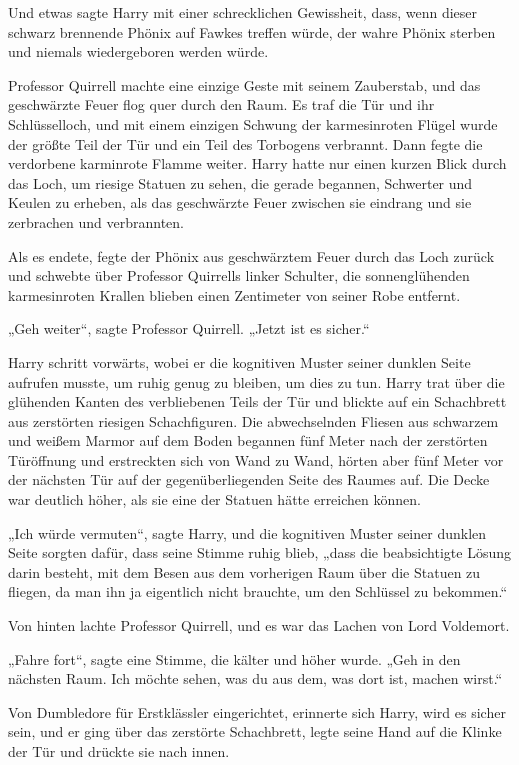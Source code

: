 {Und etwas sagte Harry mit einer schrecklichen Gewissheit, dass, wenn dieser schwarz brennende Phönix auf Fawkes treffen würde, der wahre Phönix sterben und niemals wiedergeboren werden würde.

Professor Quirrell machte eine einzige Geste mit seinem Zauberstab, und das geschwärzte Feuer flog quer durch den Raum. Es traf die Tür und ihr Schlüsselloch, und mit einem einzigen Schwung der karmesinroten Flügel wurde der größte Teil der Tür und ein Teil des Torbogens verbrannt. Dann fegte die verdorbene karminrote Flamme weiter. Harry hatte nur einen kurzen Blick durch das Loch, um riesige Statuen zu sehen, die gerade begannen, Schwerter und Keulen zu erheben, als das geschwärzte Feuer zwischen sie eindrang und sie zerbrachen und verbrannten.

Als es endete, fegte der Phönix aus geschwärztem Feuer durch das Loch zurück und schwebte über Professor Quirrells linker Schulter, die sonnenglühenden karmesinroten Krallen blieben einen Zentimeter von seiner Robe entfernt.

„Geh weiter“, sagte Professor Quirrell. „Jetzt ist es sicher.“

Harry schritt vorwärts, wobei er die kognitiven Muster seiner dunklen Seite aufrufen musste, um ruhig genug zu bleiben, um dies zu tun. Harry trat über die glühenden Kanten des verbliebenen Teils der Tür und blickte auf ein Schachbrett aus zerstörten riesigen Schachfiguren. Die abwechselnden Fliesen aus schwarzem und weißem Marmor auf dem Boden begannen fünf Meter nach der zerstörten Türöffnung und erstreckten sich von Wand zu Wand, hörten aber fünf Meter vor der nächsten Tür auf der gegenüberliegenden Seite des Raumes auf. Die Decke war deutlich höher, als sie eine der Statuen hätte erreichen können.

„Ich würde vermuten“, sagte Harry, und die kognitiven Muster seiner dunklen Seite sorgten dafür, dass seine Stimme ruhig blieb, „dass die beabsichtigte Lösung darin besteht, mit dem Besen aus dem vorherigen Raum über die Statuen zu fliegen, da man ihn ja eigentlich nicht brauchte, um den Schlüssel zu bekommen.“

Von hinten lachte Professor Quirrell, und es war das Lachen von Lord Voldemort.

„Fahre fort“, sagte eine Stimme, die kälter und höher wurde. „Geh in den nächsten Raum. Ich möchte sehen, was du aus dem, was dort ist, machen wirst.“

Von Dumbledore für Erstklässler eingerichtet, erinnerte sich Harry, wird es sicher sein, und er ging über das zerstörte Schachbrett, legte seine Hand auf die Klinke der Tür und drückte sie nach innen.

}
